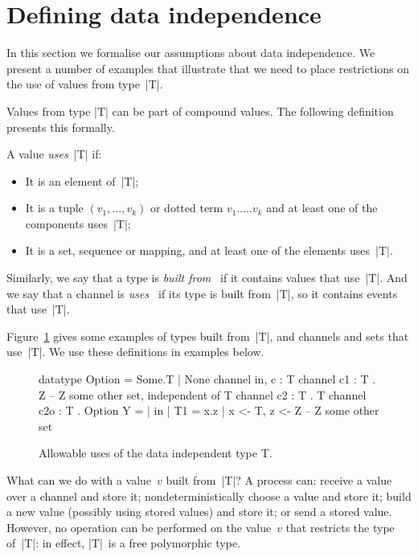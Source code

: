 \section{Defining data independence}  

In this section we formalise our assumptions about data independence.  We
present a number of examples that illustrate that we need to place
restrictions on the use of values from type~|T|. 

Values from type |T| can be part of compound values.  The following definition
presents this formally. 
%
\begin{definition}
A value \emph{uses}~|T| if:
\begin{itemize}
\item It is an element of~|T|;

\item It is a tuple $(v_1,\ldots,v_k)$ or dotted term $v_1.\ldots.v_k$ and at
least one of the components uses~|T|;

\item It is a set, sequence or mapping, and at least one of the elements
uses~|T|.
\end{itemize}

Similarly, we say that a type is \emph{built from~} if it contains
values that use~|T|.  And we say that a channel is \emph{uses~} if
its type is built from~|T|, so it contains events that use~|T|.
\end{definition}

Figure~\ref{fig:t-allowed} gives some examples of types built from~|T|, and
channels and sets that use~|T|.  We use these definitions in examples below.

\begin{figure}[th]
\begin{cspm}
datatype Option = Some.T | None
channel in, c : T
channel c1 : T . Z -- Z some other set, independent of T
channel c2 : T . T
channel c2o : T . Option
Y = {| in |}
T1 = { x.z | x <- T, z <- Z } -- Z some other set
\end{cspm}
\caption{Allowable uses of the data independent type {\cspmstyle
    T}. \label{fig:t-allowed}}
\end{figure}

What can we do with a value~$v$ built from~|T|?  A process can: receive a
value over a channel and store it; nondeterministically choose a value and
store it; build a new value (possibly using stored values) and store it; or
send a stored value.  However, no operation can be performed on the value~$v$
that restricts the type of~|T|: in effect, |T|~is a free polymorphic type.

